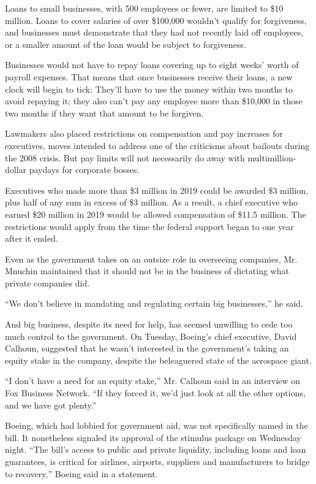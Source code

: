 Loans to small businesses, with 500 employees or fewer, are limited to
\$10 million. Loans to cover salaries of over \$100,000 wouldn't qualify
for forgiveness, and businesses must demonstrate that they had not
recently laid off employees, or a smaller amount of the loan would be
subject to forgiveness.

Businesses would not have to repay loans covering up to eight weeks'
worth of payroll expenses. That means that once businesses receive their
loans, a new clock will begin to tick: They'll have to use the money
within two months to avoid repaying it; they also can't pay any employee
more than \$10,000 in those two months if they want that amount to be
forgiven.

Lawmakers also placed restrictions on compensation and pay increases for
executives, moves intended to address one of the criticisms about
bailouts during the 2008 crisis. But pay limits will not necessarily do
away with multimillion-dollar paydays for corporate bosses.

Executives who made more than \$3 million in 2019 could be awarded \$3
million, plus half of any sum in excess of \$3 million. As a result, a
chief executive who earned \$20 million in 2019 would be allowed
compensation of \$11.5 million. The restrictions would apply from the
time the federal support began to one year after it ended.

Even as the government takes on an outsize role in overseeing companies,
Mr. Mnuchin maintained that it should not be in the business of
dictating what private companies did.

``We don't believe in mandating and regulating certain big businesses,''
he said.

And big business, despite its need for help, has seemed unwilling to
cede too much control to the government. On Tuesday, Boeing's chief
executive, David Calhoun, suggested that he wasn't interested in the
government's taking an equity stake in the company, despite the
beleaguered state of the aerospace giant.

``I don't have a need for an equity stake,'' Mr. Calhoun said in an
interview on Fox Business Network. ``If they forced it, we'd just look
at all the other options, and we have got plenty.''

Boeing, which had lobbied for government aid, was not specifically named
in the bill. It nonetheless signaled its approval of the stimulus
package on Wednesday night. ``The bill's access to public and private
liquidity, including loans and loan guarantees, is critical for
airlines, airports, suppliers and manufacturers to bridge to recovery,''
Boeing said in a statement.

